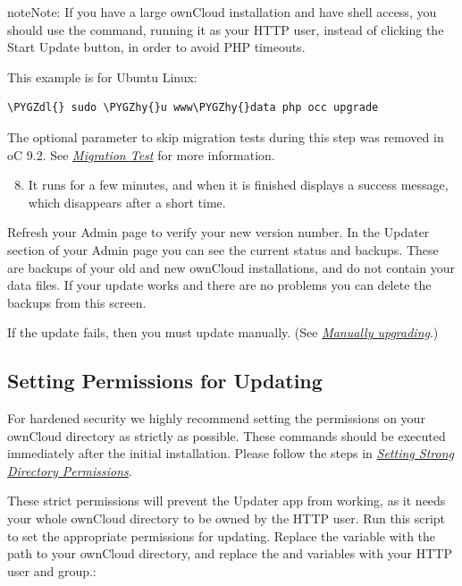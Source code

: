\documentclass[letterpaper,10pt,english]{sphinxmanual}
\def\PYGZdl{\char`\$}
\def\PYGZhy{\char`\-}
\begin{document}
\begin{notice}{note}{Note:}
If you have a large ownCloud installation and have shell access,
you should use the  command, running it as your HTTP user,
instead of clicking the Start Update button, in order to avoid PHP
timeouts.
\end{notice}

This example is for Ubuntu Linux:

\begin{Verbatim}[commandchars=\\\{\}]
\PYGZdl{} sudo \PYGZhy{}u www\PYGZhy{}data php occ upgrade
\end{Verbatim}

The optional parameter to skip migration tests during this step was removed in oC 9.2.
See {\hyperref[maintenance/upgrade:migration\string-test\string-label]{\emph{Migration Test}}} for more information.
\begin{enumerate}
\setcounter{enumi}{7}
\item {} 
It runs for a few minutes, and when it is finished displays a success
message, which disappears after a short time.

\end{enumerate}

Refresh your Admin page to verify your new version number. In the Updater
section of your Admin page you can see the current status and backups. These
are backups of your old and new ownCloud installations, and do not contain your
data files. If your update works and there are no problems you can delete the
backups from this screen.

If the update fails, then you must update manually. (See {\hyperref[maintenance/manual_upgrade::doc]{\emph{\emph{Manually
upgrading}}}}.)


\subsection{Setting Permissions for Updating}
\label{maintenance/update:setting-permissions-for-updating}\label{maintenance/update:set-updating-permissions-label}
For hardened security we  highly recommend setting the permissions on your
ownCloud directory as strictly as possible. These commands should be executed
immediately after the initial installation. Please follow the steps in
{\hyperref[installation/installation_wizard:strong\string-perms\string-label]{\emph{Setting Strong Directory Permissions}}}.

These strict permissions will prevent the Updater app from working, as it needs
your whole ownCloud directory to be owned by the HTTP user. Run this script to
set the appropriate permissions for updating. Replace the  variable
with the path to your ownCloud directory, and replace the  and
 variables with your HTTP user and group.:
\end{document}

